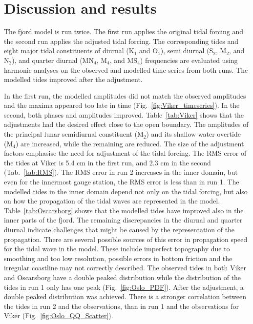 \section{Discussion and results}
\label{sec:discuss}

The fjord model is run twice. The first run applies the original tidal forcing and the second run applies the adjusted tidal forcing. The corresponding tides and eight major tidal constituents of diurnal (K$_1$ and O$_1$), semi diurnal (S$_2$, M$_2$, and N$_2$), and quarter diurnal (MN$_4$, M$_4$, and MS$_4$) frequencies are evaluated using harmonic analyses on the observed and modelled time series from both runs. The modelled tides improved after the adjustment. 

In the first run, the modelled amplitudes did not match the observed amplitudes and the maxima appeared too late in time (Fig.~\ref{fig:Viker_timeseries}). In the second, both phases and amplitudes improved. 
Table~\ref{tab:Viker} shows that the adjustments had the desired effect close to the open boundary. The amplitudes of the principal lunar semidiurnal constituent (M$_2$) and its shallow water overtide (M$_4$) are increased, while the remaining are reduced. The size of the adjustment factors emphasise the need for adjustment of the tidal forcing. 
The RMS error of the tides at Viker is 5.4 cm in the first run, and 2.3 cm in the second (Tab.~\ref{tab:RMS}). The RMS error in run 2 increases in the inner domain, but even for the innermost gauge station, the RMS error is less than in run 1.
The modelled tides in the inner domain depend not only on the tidal forcing, but also on how the propagation of the tidal waves are represented in the model. Table~\ref{tab:Oscarsborg} shows that the modelled tides have improved also in the inner parts of the fjord. The remaining  discrepancies in the diurnal and quarter diurnal indicate challenges that might be caused by the representation of the propagation. There are several possible sources of this error in propagation speed for the tidal wave in the model. These include imperfect topography due to smoothing and too low resolution, possible errors in bottom friction and the irregular coastline may not correctly described.
The observed tides in both Viker and Oscarsborg have a double peaked distribution while the distribution of the tides in run 1 only has one peak (Fig.~\ref{fig:Oslo_PDF}). After the adjustment, a double peaked distribution was achieved.
There is a stronger correlation between the tides in run 2 and the observations, than in run 1 and the observations for Viker (Fig.~\ref{fig:Oslo_QQ_Scatter}). 


